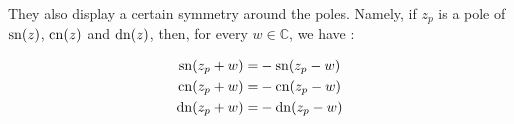 They also display a certain symmetry around the poles. Namely, if $z_p$ is a pole of $\mathrm{sn}(z)$, $\mathrm{cn}(z)$ and $\mathrm{dn}(z)$, then, for every $w \in \mathbb{C}$, we have \cite[Chapter 2]{armitage-2006}:

\begin{align}
\mathrm{sn}(z_p+w)=&-\mathrm{sn}(z_p-w) \nonumber \\
\mathrm{cn}(z_p+w)=&-\mathrm{cn}(z_p-w)  \label{eqn:zpole} \\
\mathrm{dn}(z_p+w)=&-\mathrm{dn}(z_p-w) \nonumber
\end{align}
